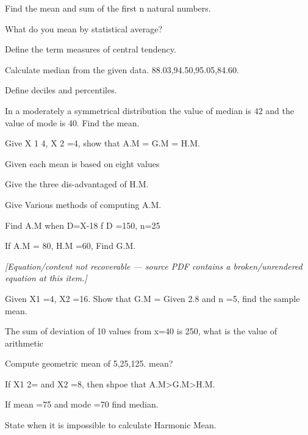 \documentclass[11pt,a4paper]{article}
\begin{document}
\begin{shortlist}
\item Find the mean and sum of the first n natural numbers.

\item What do you mean by statistical average?

\item Define the term measures of central tendency.

\item Calculate median from the given data. 88.03,94.50,95.05,84.60.

\item Define deciles and percentiles.

\item In a moderately a symmetrical distribution the value of median is 42 and the value of mode is 40. Find the mean.

\item Give X 1 4, X 2 =4, show that A.M = G.M = H.M.

\item Given each mean is based on eight values

\item Give the three dis-advantaged of H.M.

\item Give Various methods of computing A.M.

\item Find A.M when D=X-18 f D =150, n=25

\item If A.M = 80, H.M =60, Find G.M.

\item \textit{[Equation/content not recoverable --- source PDF contains a broken/unrendered equation at this item.]}

\item Given X1 =4, X2 =16. Show that G.M = Given 2.8 and n =5, find the sample mean.

\item The sum of deviation of 10 values from x=40 is 250, what is the value of arithmetic

\item Compute geometric mean of 5,25,125. mean?

\item If X1 2= and X2 =8, then shpoe that A.M>G.M>H.M.

\item If mean =75 and mode =70 find median.

\item State when it is impossible to calculate Harmonic Mean.


\end{shortlist}
\end{document}
